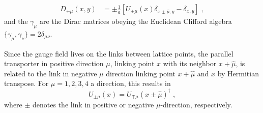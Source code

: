 \begin{align}
D_{\pm \mu}(x,y) &= \pm \frac{1}{a} \left[ U_{\pm \mu}(x) \delta_{x \pm \hat{\mu}, y} - \delta_{x,y} \right] \;,
\end{align}
and the $\gamma_{\mu}$ are the Dirac matrices obeying the Euclidean Clifford algebra $\{\gamma_{\mu}, \gamma_{\nu}\} = 2 \delta_{\mu \nu}$.

Since the gauge field lives on the links between lattice points, the parallel transporter in positive direction $\mu$, linking point $x$ with its neighbor $x + \hat{\mu}$, is related to the link in negative $\mu$ direction linking point $x + \hat{\mu}$ and $x$ by Hermitian transpose.
For $\mu=1,2,3,4$ a direction, this results in
\begin{equation}
U_{\pm \mu}(x) = U_{\mp \mu}(x \pm \hat{\mu})^{\dagger} \;,
\end{equation}
where $\pm$ denotes the link in positive or negative $\mu$-direction, respectively.

